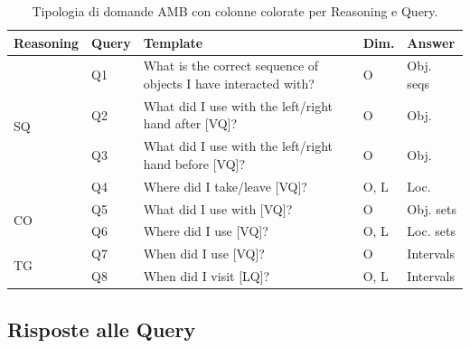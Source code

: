 \begin{table}[ht]
    \begin{center}
        \scriptsize %
        \setlength{\tabcolsep}{3pt} %
        \renewcommand{\arraystretch}{1.2} %
        \begin{tabular}{|p{1.8cm}|p{1cm}|p{7cm}|p{1cm}|p{1.5cm}|}
        \hline
        \textbf{Reasoning} & \textbf{Query} & \textbf{Template} & \textbf{Dim.} & \textbf{Answer} \\
        \hline
        \multirow{4}{*}{\textcolor[HTML]{789ECC}{SQ}} 
        & \textcolor[HTML]{789ECC}{Q1} & \raggedright What is the correct sequence of objects I have interacted with? & O & Obj. seqs \\
        \cline{2-5}
        & \textcolor[HTML]{789ECC}{Q2} & \raggedright What did I use with the left/right hand after [VQ]? & O & Obj. \\
        \cline{2-5}
        & \textcolor[HTML]{789ECC}{Q3} & \raggedright What did I use with the left/right hand before [VQ]? & O & Obj. \\
        \cline{2-5}
        & \textcolor[HTML]{789ECC}{Q4} & \raggedright Where did I take/leave [VQ]? & O, L & Loc. \\
        \hline
        \multirow{2}{*}{\textcolor[HTML]{C23A21}{CO}} 
        & \textcolor[HTML]{C23A21}{Q5} & \raggedright What did I use with [VQ]? & O & Obj. sets \\
        \cline{2-5}
        & \textcolor[HTML]{C23A21}{Q6} & \raggedright Where did I use [VQ]? & O, L & Loc. sets \\
        \hline
        \multirow{2}{*}{\textcolor[HTML]{02BF3D}{TG}} 
        & \textcolor[HTML]{02BF3D}{Q7} & \raggedright When did I use [VQ]? & O & Intervals \\
        \cline{2-5}
        & \textcolor[HTML]{02BF3D}{Q8} & \raggedright When did I visit [LQ]? & O, L & Intervals \\
        \hline
        \end{tabular}
        \caption{Tipologia di domande AMB con colonne colorate per Reasoning e Query.}
        \label{tab:amb_queries_colored}
    \end{center}
\end{table}  

\subsection*{Risposte alle Query}

